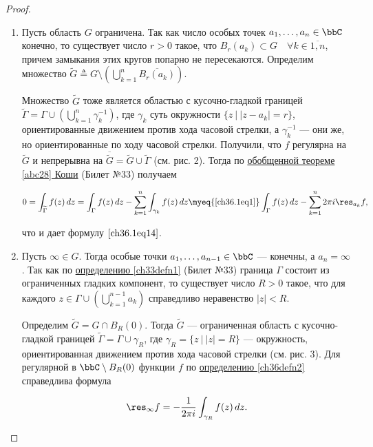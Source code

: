 \begin{proof}
\begin{enumerate}
\item Пусть область $G$ ограничена. Так как число особых точек $a_1,\ldots,a_n \in \bbC$ конечно, то существует число $r > 0$ такое, что $B_r(a_k) \subset G \quad \forall k \in \overline{1,n}$, причем замыкания этих кругов попарно не пересекаются. Определим множество $\widetilde{G} \triangleq G \setminus \left( \bigcup\limits_{k = 1}^{n} \overline{B_r(a_k)}\right)$.

Множество $\widetilde{G}$ тоже является областью с кусочно-гладкой границей $\widetilde{\Gamma} = \Gamma \cup \left( \bigcup\limits_{k = 1}^{n} \gamma_{k}^{-1} \right)$,	где $\gamma_k$ суть окружности $\{ z \: \big| \: |z - a_k| = r \}$, ориентированные движением против хода часовой стрелки, а $\gamma_{k}^{-1}$ --- они же, но ориентированные по ходу часовой стрелки. Получили, что $f$ регулярна на $\widetilde{G}$ и непрерывна на $\overline{\widetilde{G}} = \widetilde{G} \cup \widetilde{\Gamma}$ (см. рис. 2). Тогда по \hyperref[abc28]{обобщенной теореме \ref{abc28} Коши} (Билет №33) получаем

$$
0 = \int_{\widetilde{\Gamma}} f(z) \,dz = \int_{\Gamma} f(z) \,dz - \sum_{k = 1}^{n} \int_{\gamma_k} f(z) \,dz \myeq{\eqref{ch36.1eq1}} \int_{\Gamma} f(z) \,dz - \sum_{k = 1}^{n} 2\pi i \res_{a_k} f,
$$

что и дает формулу $\eqref{ch36.1eq14}$.


\item	Пусть $\infty \in G$. Тогда особые точки $a_1,\ldots,a_{n - 1} \in \bbC$ --- конечны, а $a_n = \infty$. Так как по \hyperref[ch33defn1]{определению \ref{ch33defn1}} (Билет №33) граница $\Gamma$ состоит из ограниченных гладких компонент, то существует число $R > 0$ такое, что для каждого $z \in \Gamma \cup \left( \bigcup\limits_{k = 1}^{n - 1} a_k \right)$ справедливо неравенство $|z| < R$.

Определим $\widetilde{G} = G \cap B_R(0)$. Тогда $\widetilde G$ — ограниченная область с кусочно-гладкой границей $\widetilde{\Gamma} = \Gamma \cup \gamma_R$, где $\gamma_R = \{ z \: \big| \: |z| = R\}$ --- окружность, ориентированная движением против хода часовой стрелки (см. рис. 3). Для регулярной в $\bbC \setminus B_R(0)$ функции $f$ по \hyperref[ch36defn2]{определению \ref{ch36defn2}} справедлива формула

\begin{equation} \label{ch36.1eq15}
\res_{\infty} f = - \frac{1}{2\pi i} \int_{\gamma_R} f(z) \,dz.
\end{equation}



\end{enumerate}
\end{proof}
